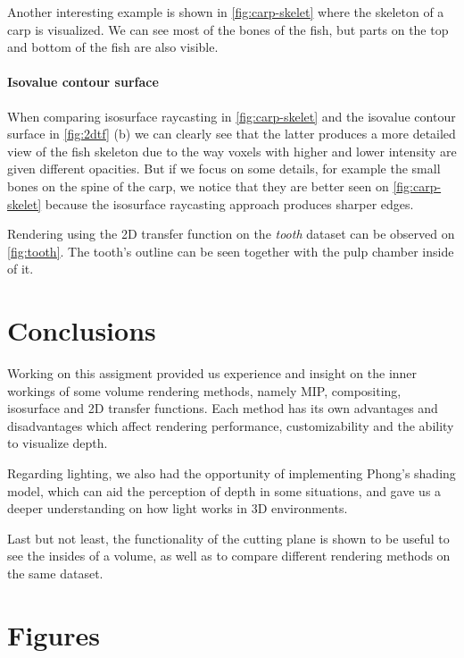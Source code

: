 \documentclass[a4paper]{article}
\begin{document}
Another interesting example is shown in \autoref{fig:carp-skelet} where the skeleton of a carp is visualized. We can see most of the bones of the fish, but parts on the top and bottom of the fish are also visible.

\paragraph{Isovalue contour surface}

When comparing isosurface raycasting in \autoref{fig:carp-skelet} and the isovalue contour surface in \autoref{fig:2dtf} (b) we can clearly see that the latter produces a more detailed view of the fish skeleton due to the way voxels with higher and lower intensity are given different opacities. But if we focus on some details, for example the small bones on the spine of the carp, we notice that they are better seen on \autoref{fig:carp-skelet} because the isosurface raycasting approach produces sharper edges.

Rendering using the 2D transfer function on the \textit{tooth} dataset can be observed on \autoref{fig:tooth}. The tooth's outline can be seen together with the pulp chamber inside of it.

\section{Conclusions}

Working on this assigment provided us experience and insight on the inner workings of some volume rendering methods, namely MIP, compositing, isosurface and 2D transfer functions. Each method has its own advantages and disadvantages which affect rendering performance, customizability and the ability to visualize depth.

Regarding lighting, we also had the opportunity of implementing Phong's shading model, which can aid the perception of depth in some situations, and gave us a deeper understanding on how light works in 3D environments.

Last but not least, the functionality of the cutting plane is shown to be useful to see the insides of a volume, as well as to compare different rendering methods on the same dataset.




\pagebreak
\appendix
\section{Figures}
\end{document}
